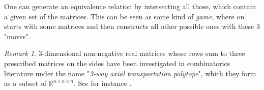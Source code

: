 \documentclass[a4paper]{amsproc}
\theoremstyle{plain}
\theoremstyle{definition}
\theoremstyle{remark}
\newtheorem{remark}[theorem]{Remark}
\numberwithin{equation}{section}
\begin{document}
\begin{center}
\end{center}
\indent One can generate an equivalence relation by intersecting all those, which contain a given set of the matrices. This can be seen as some kind of \emph{game}, where on starts with some matrices and then constructs all other possible ones with these $3$ "moves".


\begin{remark}
$3$-dimensional non-negative real matrices whose rows sum to three prescribed matrices on the sides have been investigated in combinatorics literature under the name "\emph{3-way axial transportation polytope}", which they form as a subset of $\mathbb{R}^{n\times n\times n}$. See for instance \cite{3way}.\end{remark}%
\end{document}
